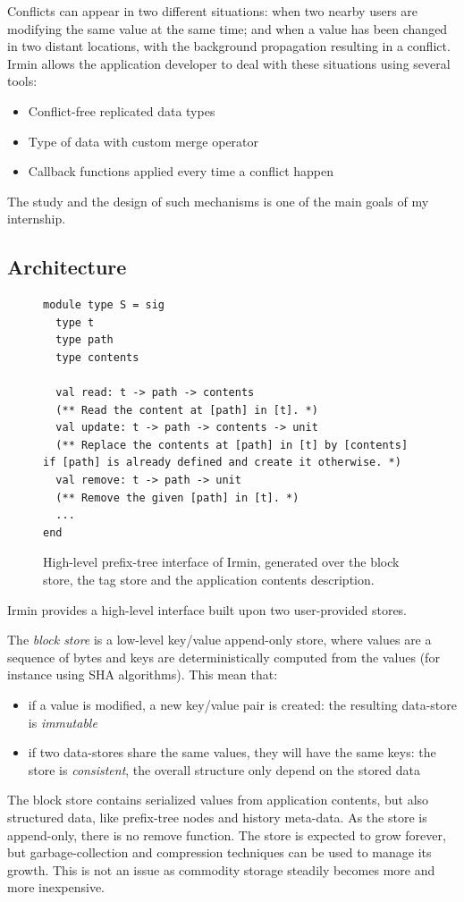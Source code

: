 \documentclass{article}
\newcommand{\irmin}{Irmin\xspace}
\begin{document}
Conflicts can appear in two different situations:
when two nearby users are modifying the same value at the same time;
and when a value has been changed in two distant locations, with the background propagation resulting in a conflict.
\irmin allows the application developer to deal with these situations using several tools:
\begin{itemize}
	\item Conflict-free replicated data types\cite{ConflictfreeReplicatedDataTypes2011}
	\item Type of data with custom merge operator
	\item Callback functions applied every time a conflict happen
\end{itemize}
The study and the design of such mechanisms is one of the main goals of my internship.


\subsection{Architecture}

\begin{figure}[hbt]
\begin{lstlisting}
module type S = sig
  type t
  type path
  type contents

  val read: t -> path -> contents
  (** Read the content at [path] in [t]. *)
  val update: t -> path -> contents -> unit
  (** Replace the contents at [path] in [t] by [contents] if [path] is already defined and create it otherwise. *)
  val remove: t -> path -> unit
  (** Remove the given [path] in [t]. *)
  ...
end
\end{lstlisting}
\caption{High-level prefix-tree interface of \irmin, generated over the block store, the tag store and the application contents description.}
\label{prefixtreesig}
\end{figure}

\irmin provides a high-level interface built upon two user-provided stores.

The \emph{block store} is a low-level key/value append-only store, where values are a sequence of bytes and keys are deterministically computed from the values (for instance using SHA algorithms).
This mean that:
\begin{itemize}
	\item if a value is modified, a new key/value pair is created: the resulting data-store is \emph{immutable}
	\item if two data-stores share the same values, they will have the same keys: the store is \emph{consistent}, the overall structure only depend on the stored data
\end{itemize}
The block store contains serialized values from application contents, but also structured data, like prefix-tree nodes and history meta-data.
As the store is append-only, there is no remove function.
The store is expected to grow forever, but garbage-collection and compression techniques can be used to manage its growth.
This is not an issue as commodity storage steadily becomes more and more inexpensive.
\end{document}
